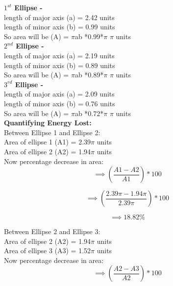 \documentclass[11pt]{scrartcl} %
\begin{document}
\textbf{$1^{st}$ Ellipse - }\\
length of major axis (a) = 2.42  units\\
length of minor axis (b) = 0.99 units\\

So area will be (A) = $\pi$ab *0.99*$\pi$ $\pi$ units\\
\textbf{$2^{nd}$ Ellipse - }\\
length of major axis (a) = 2.19 units\\
length of minor axis (b) = 0.89 units\\

So area will be (A) = $\pi$ab *0.89*$\pi$ $\pi$ units\\

\textbf{$3^{rd}$ Ellipse - }\\
length of major axis (a) = 2.09 units\\
length of minor axis (b) = 0.76 units\\

So area will be (A) = $\pi$ab *0.72*$\pi$ $\pi$ units\\

\textbf{Quantifying Energy Lost:}\\
Between Ellipse 1 and Ellipse 2:\\

Area of ellipse 1 (A1) = 2.39$\pi$ units\\
Area of ellipse 2 (A2) = 1.94$\pi$ units\\

Now percentage decrease in area:
\begin{equation*}
\implies (\frac{A1-A2}{A1})*100
\end{equation*}

\begin{equation*}
\implies (\frac{2.39\pi-1.94\pi}{2.39\pi})*100
\end{equation*}

\begin{equation*}
\implies 18.82 \%
\end{equation*}

Between Ellipse 2 and Ellipse 3:\\

Area of ellipse 2 (A2) = 1.94$\pi$ units\\
Area of ellipse 3 (A3) = 1.52$\pi$ units\\

Now percentage decrease in area:
\begin{equation*}
\implies (\frac{A2-A3}{A2})*100
\end{equation*}
\end{document}
